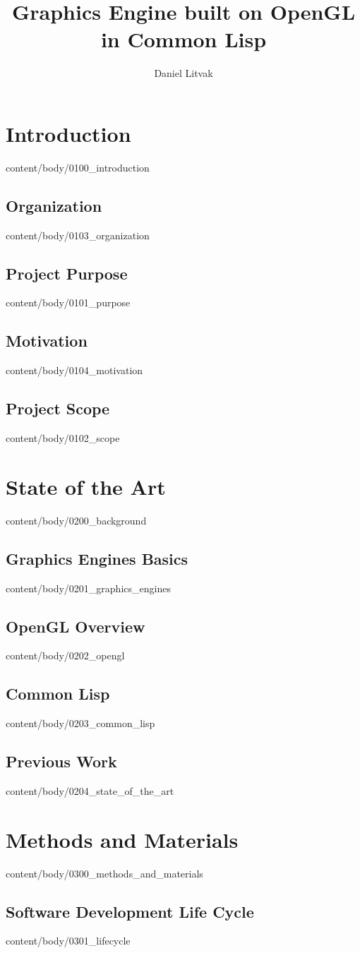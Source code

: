 \documentclass[english, tfg, loc, lof, covers, printable, firstnumbered, epsbased]{tfgtfmthesisuam}
\title{Graphics Engine built on OpenGL in Common Lisp}
\author{Daniel Litvak}
\begin{document}



\chapter{Introduction}{content/body/0100_introduction}
  \section{Organization}{content/body/0103_organization}
  \section{Project Purpose}{content/body/0101_purpose}
  \section{Motivation}{content/body/0104_motivation}
  \section{Project Scope}{content/body/0102_scope}

\chapter{State of the Art}{content/body/0200_background}
  \section{Graphics Engines Basics}{content/body/0201_graphics_engines}
  \section{OpenGL Overview}{content/body/0202_opengl}
  \section{Common Lisp}{content/body/0203_common_lisp}
  \section{Previous Work}{content/body/0204_state_of_the_art}

\chapter{Methods and Materials}{content/body/0300_methods_and_materials}
  \section{Software Development Life Cycle}{content/body/0301_lifecycle}
\end{document}
